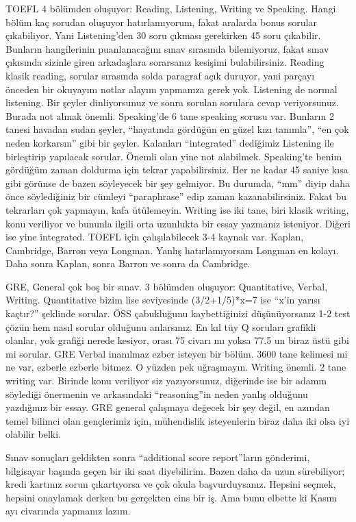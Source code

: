 \documentclass[12pt]{article}
\begin{document}
TOEFL 4 bölümden oluşuyor: Reading, Listening, Writing ve Speaking. Hangi bölüm kaç sorudan oluşuyor hatırlamıyorum, fakat aralarda bonus sorular çıkabiliyor. Yani Listening'den 30 soru çıkması gerekirken 45 soru çıkabilir. Bunların hangilerinin puanlanacağını sınav sırasında bilemiyoruz, fakat sınav çıkısında sizinle giren arkadaşlara sorarsanız kesişimi bulabilirsiniz. Reading klasik reading, sorular sırasında solda paragraf açık duruyor, yani parçayı önceden bir okuyayım notlar alayım yapmanıza gerek yok. Listening de normal listening. Bir şeyler dinliyorsunuz ve sonra sorulan sorulara cevap veriyorsunuz. Burada not almak önemli. Speaking'de 6 tane speaking sorusu var. Bunların 2 tanesi havadan sudan şeyler, “hayatında gördüğün en güzel kızı tanımla'', “en çok neden korkarsın'' gibi bir şeyler. Kalanları ``integrated'' dediğimiz Listening ile birleştirip yapılacak sorular. Önemli olan yine not alabilmek. Speaking'te benim gördüğüm zaman doldurma için tekrar yapabilirsiniz. Her ne kadar 45 saniye kısa gibi görünse de bazen söyleyecek bir şey gelmiyor. Bu durumda, “mm” diyip daha önce söylediğiniz bir cümleyi ``paraphrase'' edip zaman kazanabilirsiniz.  Fakat bu tekrarları çok yapmayın, kafa ütülemeyin. Writing ise iki tane, biri klasik writing, konu veriliyor ve bununla ilgili orta uzunlukta bir essay yazmanız isteniyor. Diğeri ise yine integrated. TOEFL için çalışılabilecek 3-4 kaynak var. Kaplan, Cambridge, Barron veya Longman. Yanlış hatırlamıyorsam Longman en kolayı. Daha sonra Kaplan, sonra Barron ve sonra da Cambridge.  

GRE, General çok boş bir sınav. 3 bölümden oluşuyor: Quantitative, Verbal, Writing. Quantitative bizim lise seviyesinde (3/2+1/5)*x=7 ise “x’in yarısı kaçtır?'' şeklinde sorular. ÖSS çabukluğunu kaybettiğinizi düşünüyorsanız 1-2 test çözün hem nasıl sorular olduğunu anlarsınız. En kıl tüy Q soruları grafikli olanlar, yok grafiği nerede kesiyor, orası 75 civarı mı yoksa 77.5 un biraz üstü gibi mi sorular. GRE Verbal inanılmaz ezber isteyen bir bölüm. 3600 tane kelimesi mi ne var, ezberle ezberle bitmez. O yüzden pek uğraşmayın. Writing önemli. 2 tane writing var. Birinde konu veriliyor siz yazıyorsunuz, diğerinde ise bir adamın söylediği önermenin ve arkasındaki ``reasoning''in neden yanlış olduğunu yazdığınız bir essay. GRE general çalışmaya değecek bir şey değil, en azından temel bilimci olan gençlerimiz için, mühendislik isteyenlerin biraz daha iki olsa iyi olabilir belki.  

Sınav sonuçları geldikten sonra ``additional score report''ların gönderimi, bilgisayar başında geçen bir iki saat diyebilirim. Bazen daha da uzun sürebiliyor; kredi kartınız sorun çıkartıyorsa ve çok okula başvurduysanız. Hepsini seçmek, hepsini onaylamak derken bu gerçekten cins bir iş. Ama bunu elbette ki Kasım ayı civarında yapmanız lazım. 
\end{document}
